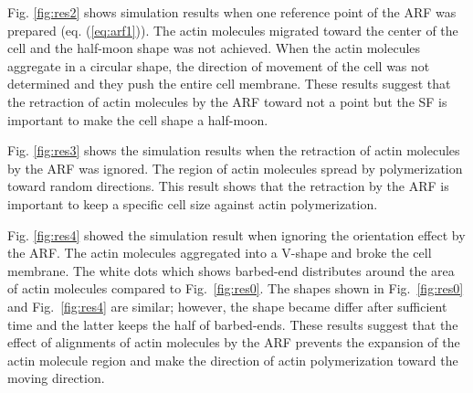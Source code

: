 \documentclass[a4paper,12pt, oneside]{book}
\begin{document}
Fig. \ref{fig:res2} shows simulation results when one reference point of the ARF was prepared (eq. (\ref{eq:arf1})).
The actin molecules migrated toward the center of the cell and the half-moon shape was not achieved.
When the actin molecules aggregate in a circular shape, the direction of movement of the cell was not determined and they push the entire cell membrane.
These results suggest that the retraction of actin molecules by the ARF toward not a point but the SF is important to make the cell shape a half-moon.

Fig. \ref{fig:res3} shows the simulation results when the retraction of actin molecules by the ARF was ignored.
The region of actin molecules spread by polymerization toward random directions.
This result shows that the retraction by the ARF is important to keep a specific cell size against actin polymerization.

Fig. \ref{fig:res4} showed the simulation result when ignoring the orientation effect by the ARF.
The actin molecules aggregated into a V-shape and broke the cell membrane.
The white dots which shows barbed-end distributes around the area of actin molecules compared to Fig.~\ref{fig:res0}.
The shapes shown in Fig.~\ref{fig:res0} and Fig.~\ref{fig:res4} are similar; however, the shape became differ after sufficient time and the latter keeps the half of barbed-ends. 
These results suggest that the effect of alignments of actin molecules by the ARF prevents the expansion of the actin molecule region and make the direction of actin polymerization toward the moving direction.
\end{document}
